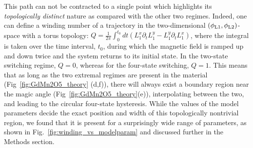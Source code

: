 This path can not be contracted to a single point which highlights its {\em  topologically distinct} nature as compared with the other two regimes. Indeed, one can define a winding number of a trajectory in the two-dimensional  $(\phi_{\rm L1},\phi_{\rm L2})$-space with a torus topology: $Q=\frac{1}{2\pi}\int_0^{t_0} dt (L_1^x\partial_t L_1^y - L_1^y \partial_t L_1^x)$, 
where the integral is taken over the time interval, $t_0$, during which the magnetic field is ramped up and down twice and the system returns to its initial state. In the two-state switching regime, $Q  = 0$, whereas for the four-state switching, $Q = 1$.
This means that as long as the two extremal regimes are present in the material (Fig~\ref{fig:GdMn2O5_theory} (d,f)), there will always exist a boundary region near the magic angle (Fig~\ref{fig:GdMn2O5_theory}(e)), interpolating between the two, and leading to the circular four-state hysteresis.
While the values of the model parameters decide the exact position and width of this topologically nontrivial region, we found that it is present for a surprisingly wide range of parameters, as shown in Fig.~\ref{fig:winding_vs_modelparam} and discussed further in the Methods section.

